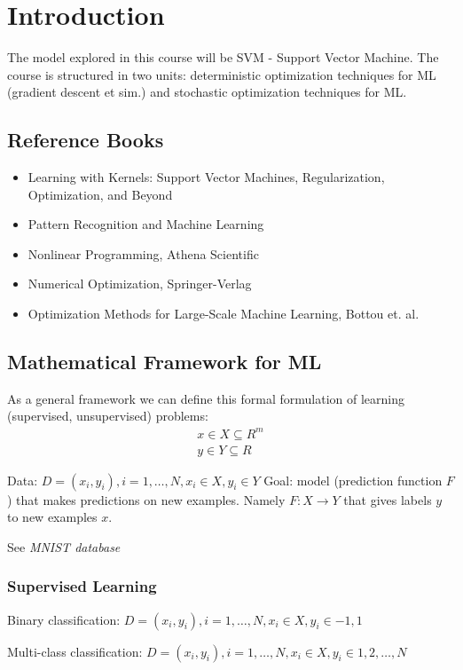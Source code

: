 \chapter{Introduction}

The model explored in this course will be SVM - Support Vector Machine.
The course is structured in two units: deterministic optimization techniques for ML (gradient descent et sim.) and stochastic optimization techniques for ML.

\section{Reference Books}
\begin{itemize}
  \item Learning with Kernels: Support Vector Machines, Regularization, Optimization, and Beyond
  \item Pattern Recognition and Machine Learning
  \item Nonlinear Programming, Athena Scientific
  \item Numerical Optimization, Springer-Verlag
  \item Optimization Methods for Large-Scale Machine Learning, Bottou et. al.
\end{itemize}

\section{Mathematical Framework for ML}
As a general framework we can define this formal formulation of learning (supervised, unsupervised) problems:
\begin{align}
x \in X \subseteq R^m \\
y \in Y \subseteq R
\end{align}

Data: $D = {(x_i, y_i), i=1,\dots,N, x_i \in X, y_i \in Y}$
Goal: model (prediction function $F$) that makes predictions on new examples. Namely $F: X \rightarrow Y$ that gives labels $y$ to new examples $x$.

See \textit{MNIST database}

\subsection{Supervised Learning}
Binary classification: $D = {(x_i, y_i), i=1,\dots,N, x_i \in X, y_i \in {-1, 1}}$

Multi-class classification: $D = {(x_i, y_i), i=1,\dots,N, x_i \in X, y_i \in {1, 2, \dots, N}}$

